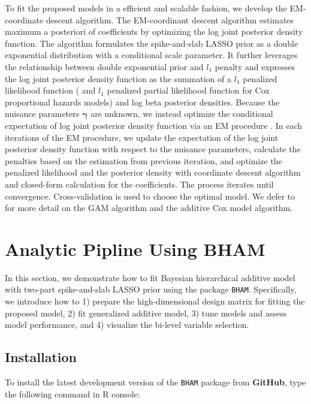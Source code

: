 \documentclass[
]{jss}
\begin{document}
To fit the proposed models in a efficient and scalable fashion, we
develop the EM-coordinate descent algorithm. The EM-coordinant descent
algorithm estimates maximum a posteriori of coefficients by optimizing
the log joint posterior density function. The algorithm formulates the
spike-and-slab LASSO prior as a double exponential distribution with a
conditional scale parameter. It further leverages the relationship
between double exponential prior and \(l_1\) penalty and expresses the
log joint posterior density function as the summation of a \(l_1\)
penalized likelihood function ( and \(l_1\) penalized partial likelihood
function for Cox proportional hazards models) and log beta posterior
densities. Because the nuisance parameters \(\boldsymbol{\gamma}\) are
unknown, we instead optimize the conditional expectation of log joint
posterior density function via an EM procedure \citep{dempster1977}. In
each iterations of the EM procedure, we update the expectation of the
log joint posterior density function with respect to the nuisance
parameters, calculate the penalties based on the estimation from
previous iteration, and optimize the penalized likelihood and the
posterior density with coordinate descent algorithm and closed-form
calculation for the coefficients. The process iterates until
convergence. Cross-validation is used to choose the optimal model. We
defer to \cite{guo2022_GAM, guo2022_Cox} for more detail on the GAM
algorithm and the additive Cox model algorithm.

\section{Analytic Pipline Using BHAM}

In this section, we demonstrate how to fit Bayesian hierarchical
additive model with two-part spike-and-slab LASSO prior using the
package \texttt{BHAM}. Specifically, we introduce how to 1) prepare the
high-dimensional design matrix for fitting the proposed model, 2) fit
generalized additive model, 3) tune models and assess model performance,
and 4) visualize the bi-level variable selection.

\subsection{Installation}

To install the latest development version of the \texttt{BHAM} package
from \textbf{GitHub}, type the following command in R console:
\end{document}
